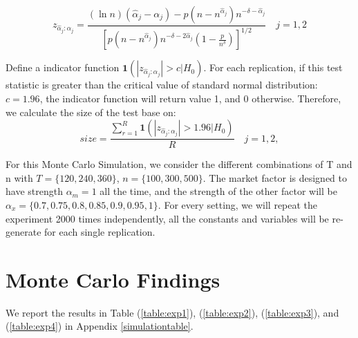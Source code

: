 	\[  z_{\hat{\alpha}_j:\alpha_j} =\frac{(\ln n)\left(\hat{\alpha}_j-\alpha_{j}\right)-p\left(n-n^{\hat{\alpha}_j}\right) n^{-\delta-\hat{\alpha}_j}}{\left[p\left(n-n^{\hat{\alpha}_j}\right) n^{-\delta-2 \hat{\alpha}_j}\left(1-\frac{p}{n^{\delta}}\right)\right]^{1 / 2}}\quad j=1,2 \tag{9}  \label{z_indicator}\]

Define a indicator function $\bm{1}(|z_{\hat{\alpha}_j:\alpha_j} |>c|H_0)$.
For each replication, if this test statistic is greater than the critical value of standard normal distribution: $c = 1.96$, the indicator function will return value 1, and 0 otherwise.
Therefore, we calculate the size of the test base on:
	\[ size = \frac{\sum_{r=1}^{R} \bm{1}(|z_{\hat{\alpha}_j:\alpha_j} |>1.96|H_0)}{R} \quad j =1,2 \tag{10}, \label{size_calculator}\]


For this Monte Carlo Simulation, we consider the different combinations of T and n with $T = \{120, 240, 360\}$, $n =\{100, 300, 500\} $.
The market factor is designed to have strength $\alpha_m = 1$ all the time, and the strength of the other factor will be $\alpha_{x} = \{0.7, 0.75, 0.8,0.85, 0.9,0.95, 1\}$. 
For every setting, we will repeat the experiment 2000 times independently, all the constants and variables will be re-generate for each single replication.


 
	\section{Monte Carlo Findings}\label{MC_findings}
We report the results in Table (\ref{table:exp1}), (\ref{table:exp2}), (\ref{table:exp3}), and (\ref{table:exp4}) in Appendix \ref{simulationtable}.

